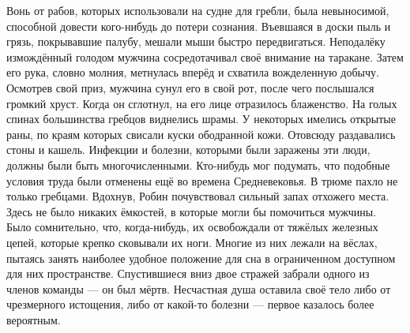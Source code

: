 \documentclass[a4paper,12pt]{book}
\begin{document}
	Вонь от рабов, которых использовали на судне для гребли, была невыносимой, способной довести кого-нибудь до потери сознания. Въевшаяся в доски пыль и грязь, покрывавшие палубу, мешали мыши быстро передвигаться. Неподалёку измождённый голодом мужчина сосредотачивал своё внимание на таракане. Затем его рука, словно молния, метнулась вперёд и схватила вожделенную добычу. Осмотрев свой приз, мужчина сунул его в свой рот, после чего послышался громкий хруст. Когда он сглотнул, на его лице отразилось блаженство.
	На голых спинах большинства гребцов виднелись шрамы. У некоторых имелись открытые раны, по краям которых свисали куски ободранной кожи. Отовсюду раздавались стоны и кашель. Инфекции и болезни, которыми были заражены эти люди, должны были быть многочисленными. Кто-нибудь мог подумать, что подобные условия труда были отменены ещё во времена Средневековья.
	В трюме пахло не только гребцами. Вдохнув, Робин почувствовал сильный запах отхожего места. Здесь не было никаких ёмкостей, в которые могли бы помочиться мужчины. Было сомнительно, что, когда-нибудь, их освобождали от тяжёлых железных цепей, которые крепко сковывали их ноги. Многие из них лежали на вёслах, пытаясь занять наиболее удобное положение для сна в ограниченном доступном для них пространстве. Спустившиеся вниз двое стражей забрали одного из членов команды — он был мёртв. Несчастная душа оставила своё тело либо от чрезмерного истощения, либо от какой-то болезни — первое казалось более вероятным.
\end{document}
